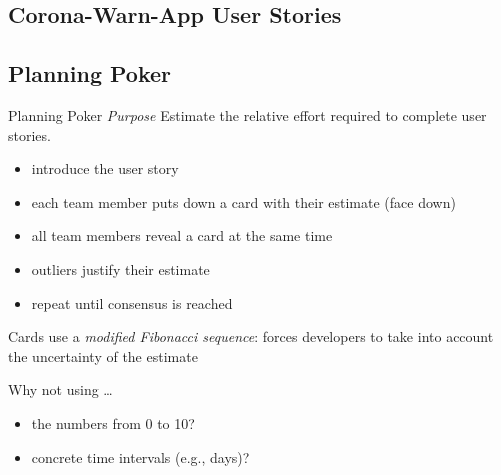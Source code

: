 \subsection{Corona-Warn-App User Stories}
\begin{frame}{\insertsubsection}
	\centering{}
\end{frame}
\begin{frame}{\insertsubsection}
	\centering{}
\end{frame}
\begin{frame}{\insertsubsection}
	\centering{}
\end{frame}

\subsection{Planning Poker}
\begin{frame}{\insertsubsection}
	\begin{fancycolumns}
		\begin{definition}{Planning Poker }
			\emph{Purpose} Estimate the relative effort required to complete user stories.
			\begin{itemize}
				\item introduce the user story
				\item each team member puts down a card with their estimate (face down)
				\item all team members reveal a card at the same time
				\item outliers justify their estimate
				\item repeat until consensus is reached
			\end{itemize}
			Cards use a \emph{modified Fibonacci sequence}: forces developers to take into account the uncertainty of the estimate
		\end{definition}
	\nextcolumn
		\pause
		\begin{note}{Why not using \ldots}
			\begin{itemize}
				\item the numbers from 0 to 10?
				\item concrete time intervals (e.g., days)?
			\end{itemize}
		\end{note}
	\end{fancycolumns}
\end{frame}


